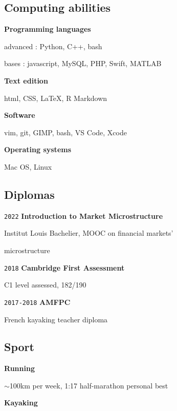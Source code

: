 \documentclass{article}
\begin{document}
\begin{multicols}{2}
	{\color{blue} \subsection*{Computing abilities}}

		\noindent\textbf{Programming languages}

		advanced : Python, C++, bash
				
		bases : javascript, MySQL, PHP, Swift, MATLAB

\hfill

		\noindent\textbf{Text edition}

		html, CSS, LaTeX, R Markdown

\hfill

		\noindent\textbf{Software}

		vim, git, GIMP, bash, VS Code, Xcode

\hfill

		\noindent\textbf{Operating systems}

		Mac OS, Linux

\hfill

{\color{blue} \subsection*{Diplomas}}

		\noindent\texttt{2022} \textbf{Introduction to Market Microstructure}

		Institut Louis Bachelier, MOOC on financial markets' 

		microstructure

\hfill

		\noindent\texttt{2018} \textbf{Cambridge First Assessment}

		C1 level assessed, 182/190

\hfill

		\noindent\texttt{2017-2018} \textbf{AMFPC}

		French kayaking teacher diploma

\hfill

{\color{blue} \subsection*{Sport}\label{sport}}

		\noindent\textbf{Running}

		$\sim$100km per week, 1:17 half-marathon personal best

\hfill

		\noindent\textbf{Kayaking}


\end{multicols}
\end{document}
